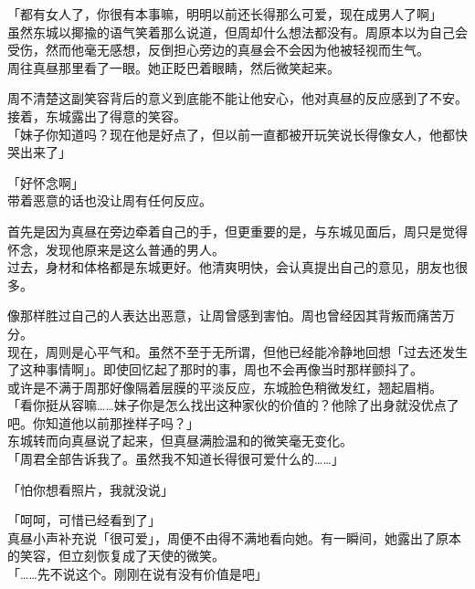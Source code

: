 「都有女人了，你很有本事嘛，明明以前还长得那么可爱，现在成男人了啊」\\

虽然东城以揶揄的语气笑着那么说道，但周却什么想法都没有。周原本以为自己会受伤，然而他毫无感想，反倒担心旁边的真昼会不会因为他被轻视而生气。\\

周往真昼那里看了一眼。她正眨巴着眼睛，然后微笑起来。

周不清楚这副笑容背后的意义到底能不能让他安心，他对真昼的反应感到了不安。接着，东城露出了得意的笑容。\\

「妹子你知道吗？现在他是好点了，但以前一直都被开玩笑说长得像女人，他都快哭出来了」

「好怀念啊」\\

带着恶意的话也没让周有任何反应。

首先是因为真昼在旁边牵着自己的手，但更重要的是，与东城见面后，周只是觉得怀念，发现他原来是这么普通的男人。\\

过去，身材和体格都是东城更好。他清爽明快，会认真提出自己的意见，朋友也很多。

像那样胜过自己的人表达出恶意，让周曾感到害怕。周也曾经因其背叛而痛苦万分。\\

现在，周则是心平气和。虽然不至于无所谓，但他已经能冷静地回想「过去还发生了这种事情啊」。即使回忆起了那时的事，周也不会再像当时那样颤抖了。\\

或许是不满于周那好像隔着层膜的平淡反应，东城脸色稍微发红，翘起眉梢。\\

「看你挺从容嘛……妹子你是怎么找出这种家伙的价值的？他除了出身就没优点了吧。你知道他以前那挫样子吗？」\\

东城转而向真昼说了起来，但真昼满脸温和的微笑毫无变化。\\

「周君全部告诉我了。虽然我不知道长得很可爱什么的……」

「怕你想看照片，我就没说」

「呵呵，可惜已经看到了」\\

真昼小声补充说「很可爱」，周便不由得不满地看向她。有一瞬间，她露出了原本的笑容，但立刻恢复成了天使的微笑。\\

「……先不说这个。刚刚在说有没有价值是吧」\\

